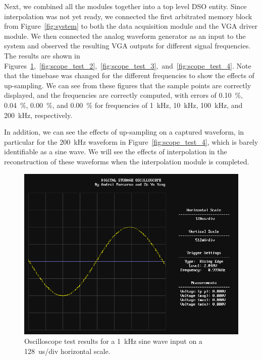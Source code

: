 \documentclass[journal]{IEEEtran}
\begin{document}
Next, we combined all the modules together into a top level DSO entity. Since interpolation was not yet ready, we connected the first arbitrated memory block from Figure~\ref{fig:system} to both the data acquisition module and the VGA driver module. We then connected the analog waveform generator as an input to the system and observed the resulting VGA outputs for different signal frequencies. The results are shown in Figures~\ref{fig:scope_test_1},~\ref{fig:scope_test_2},~\ref{fig:scope_test_3},~and~\ref{fig:scope_test_4}. Note that the timebase was changed for the different frequencies to show the effects of up-sampling. We can see from these figures that the sample points are correctly displayed, and the frequencies are correctly computed, with errors of 0.10~\%, 0.04~\%, 0.00~\%, and 0.00~\% for frequencies of 1~kHz, 10~kHz, 100~kHz, and 200~kHz, respectively.

In addition, we can see the effects of up-sampling on a captured waveform, in particular for the 200~kHz waveform in Figure~\ref{fig:scope_test_4}, which is barely identifiable as a sine wave. We will see the effects of interpolation in the reconstruction of these waveforms when the interpolation module is completed.

\begin{figure}[!htb]
  \centering
  \includegraphics[width=\columnwidth]{test-results/scope_demo_1kHz.png}
  \caption{Oscilloscope test results for a 1~kHz sine wave input on a 128~us/div horizontal scale.}
  \label{fig:scope_test_1}
\end{figure}
\end{document}
